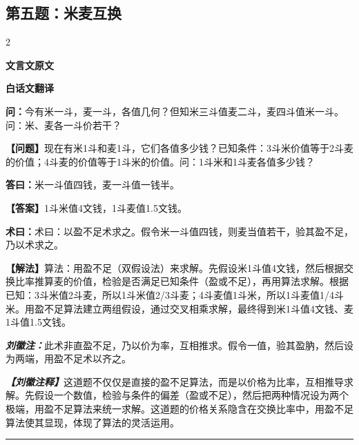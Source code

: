 \documentclass[10pt,a4paper]{article}
\newcommand{\wen}[1]{\textbf{\color{problemcolor}问：}#1\par}
\newcommand{\da}[1]{\textbf{答曰：}#1\par}
\newcommand{\shu}[1]{\textbf{术曰：}#1\par}
\newcommand{\liuhui}[1]{{\color{commentarycolor}\textit{\textbf{刘徽注：}}#1\par}}
\newcommand{\classicalheader}[1]{{\centering\large\bfseries\color{classicalcolor} #1\par\vspace{0.5em}}}
\newcommand{\wenmodern}[1]{\textbf{\color{moderncolor}【问题】}#1\par}
\newcommand{\damodern}[1]{\textbf{【答案】}#1\par}
\newcommand{\shumodern}[1]{\textbf{【解法】}#1\par}
\newcommand{\liuhuimodern}[1]{{\color{commentarycolor}\textit{\textbf{【刘徽注释】}}#1\par}}
\newcommand{\modernheader}[1]{{\centering\large\bfseries\color{moderncolor} #1\par\vspace{0.5em}}}
\newcommand{\problemsec}[1]{\subsection*{#1}}
\begin{document}
\problemsec{第五题：米麦互换}
\begin{paracol}{2}
\classicalheader{文言文原文}
\switchcolumn
\modernheader{白话文翻译}
\switchcolumn*

\wen{今有米一斗，麦一斗，各值几何？但知米三斗值麦二斗，麦四斗值米一斗。问：米、麦各一斗价若干？}

\switchcolumn

\wenmodern{现在有米1斗和麦1斗，它们各值多少钱？已知条件：3斗米价值等于2斗麦的价值；4斗麦的价值等于1斗米的价值。问：1斗米和1斗麦各值多少钱？}

\switchcolumn*

\da{米一斗值四钱，麦一斗值一钱半。}

\switchcolumn

\damodern{1斗米值4文钱，1斗麦值1.5文钱。}

\switchcolumn*

\shu{术曰：以盈不足术求之。假令米一斗值四钱，则麦当值若干，验其盈不足，乃以术求之。}

\switchcolumn

\shumodern{算法：用盈不足（双假设法）来求解。先假设米1斗值4文钱，然后根据交换比率推算麦的价值，检验是否满足已知条件（盈或不足），再用算法求解。根据已知：3斗米值2斗麦，所以1斗米值2/3斗麦；4斗麦值1斗米，所以1斗麦值1/4斗米。用盈不足算法建立两组假设，通过交叉相乘求解，最终得到米1斗值4文钱、麦1斗值1.5文钱。}

\switchcolumn*

\liuhui{此术非直盈不足，乃以价为率，互相推求。假令一值，验其盈肭，然后设为两端，用盈不足术以齐之。}

\switchcolumn

\liuhuimodern{这道题不仅仅是直接的盈不足算法，而是以价格为比率，互相推导求解。先假设一个数值，检验与条件的偏差（盈或不足），然后把两种情况设为两个极端，用盈不足算法来统一求解。这道题的价格关系隐含在交换比率中，用盈不足算法使其显现，体现了算法的灵活运用。}

\end{paracol}

\vspace{0.3cm}
\hrule
\vspace{0.3cm}
\end{document}
